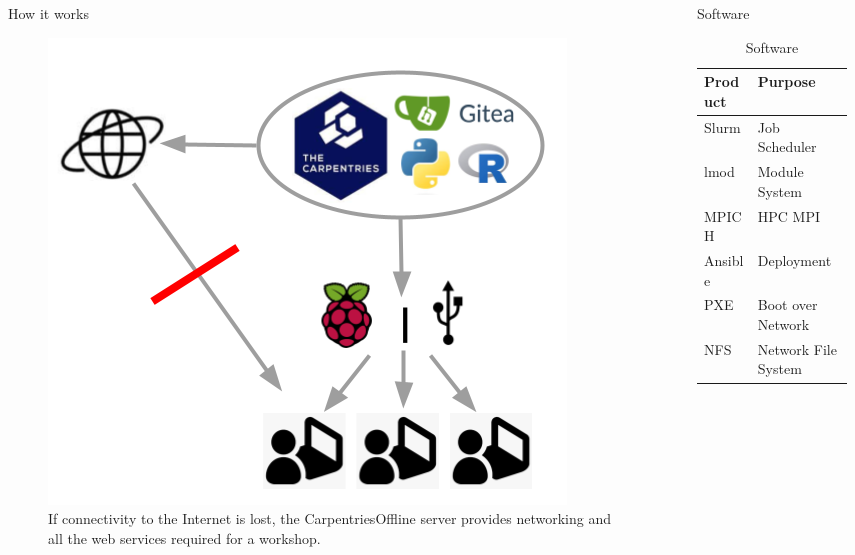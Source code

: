 \documentclass[final,20pt]{beamer}
\begin{document}
\begin{frame}[t]
		\begin{columns}[t]
			\begin{column}{0.02\paperwidth}\end{column}
			\begin{column}{0.3\paperwidth}
				\begin{block}{How it works}
					\begin{figure}
						\begin{center}
							\includegraphics[width=.6\columnwidth]{logos/carpentriesoffline_schemaidea.png}
							\caption{If connectivity to the Internet is lost, the CarpentriesOffline server provides networking and all the web services required for a workshop.}
						\end{center}
					\end{figure}
				\end{block}
			\end{column}
			\begin{column}{0.02\paperwidth}\end{column}
			\begin{column}{0.3\paperwidth}
				\begin{block}{Software}
					\begin{table}
						\parbox{.7\linewidth}{
							\centering
							\caption{Software}				
							\begin{tabular}{l|l}
								\textbf{Product} & \textbf{Purpose}\\
								\hline
								Slurm & Job Scheduler \\
								lmod & Module System \\
								MPICH & HPC MPI \\
								Ansible & Deployment \\
								PXE & Boot over Network \\
								NFS & Network File System \\

\end{tabular}}
\end{table}
\end{block}
\end{column}
\end{columns}
\end{frame}
\end{document}
